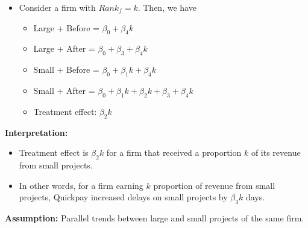 \documentclass[]{article}
\providecommand{\tightlist}{%
  \setlength{\itemsep}{0pt}\setlength{\parskip}{0pt}}
\begin{document}
\begin{itemize}
\tightlist
\item
  Consider a firm with \(Rank_f = k\). Then, we have

  \begin{itemize}
  \tightlist
  \item
    Large + Before = \(\beta_0 + \beta_4 k\)
  \item
    Large + After = \(\beta_0+\beta_3 +\beta_4 k\)
  \item
    Small + Before = \(\beta_0+\beta_1 k + \beta_4 k\)
  \item
    Small + After =
    \(\beta_0+\beta_1 k + \beta_2 k + \beta_3 + \beta_4 k\)
  \item
    Treatment effect: \(\beta_2 k\)
  \end{itemize}
\end{itemize}

\textbf{Interpretation:}

\begin{itemize}
\tightlist
\item
  Treatment effect is \(\beta_2 k\) for a firm that received a
  proportion \(k\) of its revenue from small projects.
\item
  In other words, for a firm earning \(k\) proportion of revenue from
  small projects, Quickpay increased delays on small projects by
  \(\beta_3 k\) days.
\end{itemize}

\textbf{Assumption:} Parallel trends between large and small projects of
the same firm.
\end{document}
